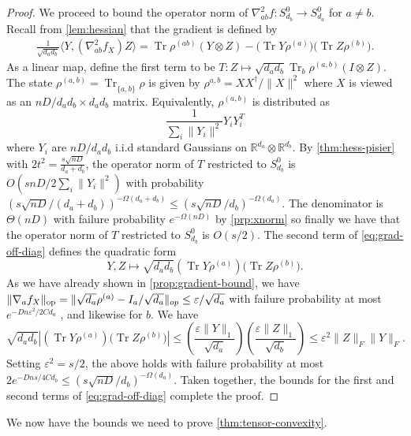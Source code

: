 \documentclass{article}
\DeclarePairedDelimiter{\norm}{\lVert}{\rVert}
\newcommand{\R}{{\mathbb{R}}}
\newcommand{\ot}{\otimes}
\newcommand{\op}{\operatorname{op}}
\newcommand\eps{\varepsilon}
\newcommand\Sym{\mathcal{S}}
\newcommand\smallSym{S}
\newcommand\rv{X}
\newcommand\tr{\operatorname{Tr}}
\newcommand{\CF}[1]{{\color{purple}[CF: #1]}}
\begin{document}
\begin{proof}
We proceed to bound the operator norm of $\nabla^2_{ab} f: \smallSym^0_{d_b} \to \smallSym^0_{d_a}$ for $a \neq b$. Recall from \cref{lem:hessian} that the gradient is defined by
\begin{align}\frac1{\sqrt{d_a d_b}} \langle Y,  \left( \nabla^2_{ab} f_{\rv} \right) Z \rangle
= \tr \rho^{(ab)} \left( Y \ot Z \right) - \bigl(\tr Y \rho^{(a)}\bigr)\bigl(\tr Z \rho^{(b)}\bigr).\label{eq:grad-off-diag}\end{align}
As a linear map, define the first term to be $T:Z \mapsto \sqrt{d_a d_b} \tr_b \rho^{(a,b)} (I \ot Z)$. The state $\rho^{(a,b)} = \tr_{\overline{\{a,b\}}} \rho$ is given by $\rho^{{a,b}} =  X X^\dagger/\|X\|^2$ where $X$ is viewed as an $n D/{d_a d_b} \times d_a d_b$ matrix. Equivalently, $\rho^{(a,b)}$ is distributed as 
$$\frac{1}{\sum_{i} \|Y_i\|^2} Y_i Y_i^T$$ where $Y_i$ are $n D/{d_a d_b}$ i.i.d standard Gaussians on $\R^{d_a} \ot \R^{d_b}$. By \cref{thm:hess-pisier} with $2t^2 = \frac {s \sqrt{nD}}{d_a + d_b}$, the operator norm of $T$ restricted to $\smallSym^0_{d_b}$ is $O(s n D /2 \sum_i \|Y_i\|^2 )$ 
with probability $(s \sqrt{nD}/(d_a + d_b))^{ - \Omega(d_a + d_b)} \leq (s \sqrt{nD} /d_b)^{ - \Omega(d_a)}$. The denominator is $\Theta(nD)$ with failure probability $e^{ -\Omega(nD)} $ by \cref{prp:xnorm} so finally we have that the operator norm of $T$ restricted to $\smallSym^0_{d_b}$ is $O \left( s/2\right)$.
The second term of \cref{eq:grad-off-diag} defines the quadratic form 
$$Y,Z \mapsto \sqrt{d_a d_b} (\tr Y \rho^{(a)})\bigl(\tr Z \rho^{(b)}\bigr).$$ 
As we have already shown in \cref{prop:gradient-bound}, we have $\norm{\nabla_a f_{\rv}}_{\op} = \|\sqrt{d_a} \rho^{(a)} - I_a/\sqrt{d_a}\|_{op} \leq \eps/\sqrt{d_a}$ with failure probability at most $e^{-D n \eps^2/2Cd_a}$ , and likewise for $b$. We have$$\sqrt{d_a d_b} |(\tr Y  \rho^{(a)})\bigl(\tr Z \rho^{(b)}\bigr)| \leq \left( \frac{\eps \|Y\|_{1}}{\sqrt{d_{a}}} \right) \left( \frac{\eps \|Z\|_{1}}{\sqrt{d_{b}}} \right) \leq \eps^2 \|Z\|_F\|Y\|_F.$$
Setting $\eps^2 =  s/2$, the above holds with failure probability at most $2e^{- Dn s /4Cd_b}  \leq (s \sqrt{nD} /d_b)^{ - \Omega(d_a)}.$ Taken together, the bounds for the first and second terms of \cref{eq:grad-off-diag} complete the proof. %
\end{proof}
We now have the bounds we need to prove \cref{thm:tensor-convexity}.
\end{document}
